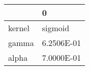 \begin{tabular}{ll}
\toprule
{} &          0 \\
\midrule
kernel &    sigmoid \\
gamma  & 6.2506E-01 \\
alpha  & 7.0000E-01 \\
\bottomrule
\end{tabular}
